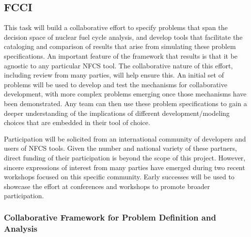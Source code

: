 
\subsection{\gls{FCCI}}

This task will build a collaborative effort to specify problems that span the
decision space of nuclear fuel cycle analysis, and develop tools that
facilitate the cataloging and comparison of results that arise from simulating
these problem specifications.  An important feature of the framework that
results is that it be agnostic to any particular \gls{NFCS} tool.  The
collaborative nature of this effort, including review from many parties, will
help ensure this.  An initial set of problems will be used to develop and test
the mechanisms for collaborative development, with more complex problems
emerging once those mechanisms have been demonstrated.  Any team can then use
these problem specifications to gain a deeper understanding of the
implications of different development/modeling choices that are embedded in
their tool of choice.

Participation will be solicited from an international community of developers
and users of \gls{NFCS} tools.  Given the number and national variety of these
partners, direct funding of their participation is beyond the scope of this
project.  However, sincere expressions of interest from many parties have
emerged during two recent workshops focused on this specific community.  Early
successes will be used to showcase the effort at conferences and workshops to
promote broader participation.



\subsubsection{Collaborative Framework for Problem Definition and Analysis} 


